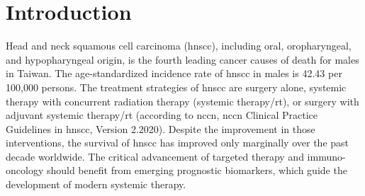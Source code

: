 \documentclass[cancers,article,submit,moreauthors,pdftex]{Definitions/mdpi}
\begin{document}


\section{Introduction}

Head and neck squamous cell carcinoma (\acrshort{hnscc}), including oral, oropharyngeal, and hypopharyngeal origin, is the fourth leading cancer causes of death for males in Taiwan\cite{MOHW_death2017}. The age-standardized incidence rate of \acrshort{hnscc} in males is 42.43 per 100,000 persons\cite{MOHW_incidence2018}. 
The treatment strategies of \acrshort{hnscc} are surgery alone, systemic therapy with concurrent radiation therapy (systemic therapy/\acrshort{rt}), or surgery with adjuvant systemic therapy/\acrshort{rt} (according to \acrlong{nccn}, \acrshort{nccn} Clinical Practice Guidelines in \acrshort{hnscc}, Version 2.2020)\cite{Pfister2020a}. Despite the improvement in those interventions, the survival of \acrshort{hnscc} has improved only marginally over the past decade worldwide\cite{hpa2019}. The critical advancement of targeted therapy and immuno-oncology should benefit from emerging prognostic biomarkers, which guide the development of modern systemic therapy.
\end{document}
